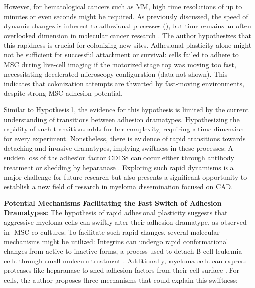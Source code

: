 However, for hematological cancers such as MM, high time resolutions of up to
minutes or even seconds might be required. As previously discussed, the speed of
dynamic changes is inherent to adhesional processes
(), but time remains an often
overlooked dimension in molecular cancer research%
\cite{uthamacumaranReviewMathematicalComputational2022}. The author hypothesizes
that this rapidness is crucial for colonizing new sites. Adhesional plasticity
alone might not be sufficient for successful attachment or survival: \INA cells
failed to adhere to \ac{MSC} during live-cell imaging if the motorized stage top
was moving too fast, necessitating decelerated microscopy configuration (data
not shown). This indicates that colonization attempts are thwarted by
fast-moving environments, despite strong \ac{MSC} adhesion potential.

Similar to Hypothesis\,1, the evidence for this hypothesis is limited by the
current understanding of transitions between adhesion dramatypes. Hypothesizing
the rapidity of such transitions adds further complexity, requiring a
time-dimension for every experiment. Nonetheless, there is evidence of rapid
transitions towards detaching and invasive dramatypes, implying swiftness in
these processes: A sudden loss of the adhesion factor CD138 can
occur either through antibody treatment or shedding by heparanase
\cite{yangHeparanasePromotesSpontaneous2005,
      akhmetzyanovaDynamicCD138Surface2020}. Exploring such rapid dynamisms is a major
challenge for future research but also presents a significant opportunity to
establish a new field of research in myeloma dissemination focused on \ac{CAD}.


\textbf{Potential Mechanisms Facilitating the Fast Switch of Adhesion Dramatypes:}
The hypothesis of rapid adhesional plasticity suggests that aggressive myeloma
cells can swiftly alter their adhesion dramatype, as observed in \INA-\ac{MSC}
co-cultures. To facilitate such rapid changes, several molecular mechanisms
might be utilized: Integrins can undergo rapid conformational changes from
active to inactive forms, a process used to detach B-cell leukemia cells through
small molecule treatment \cite{ruanVitroVivoEffects2022}. Additionally, myeloma
cells can express proteases like heparanase to shed adhesion factors from their
cell surface \cite{yangHeparanasePromotesSpontaneous2005}. For \INA cells, the
author proposes three mechanisms that could explain this swiftness:

